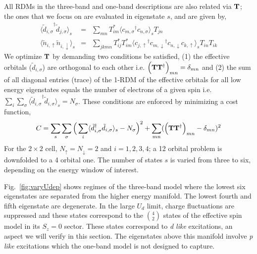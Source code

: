 All RDMs in the three-band and one-band descriptions are also related via ${\bf T}$; 
the ones that we focus on are evaluated in eigenstate $s$, and are given by,
\begin{subequations}
\begin{eqnarray}
	\langle {\tilde{d}_{i,\sigma}}^{\dagger} \tilde{d}_{j,\sigma} \rangle_{s} &=& \sum_{mn} T^{*}_{im} \langle {c_{m,\sigma}}^{\dagger} c_{n,\sigma} \rangle_{s} T_{jn} \label{eq:dmstransformations1} \\
	\langle \tilde{n}_{i,\uparrow} \tilde{n}_{i,\downarrow} \rangle_{s} &=& \sum_{jkmn} T^{*}_{ij} T^{*}_{im} \langle {c_{j,\uparrow}}^{\dagger} {c_{m,\downarrow}}^{\dagger} c_{n,\downarrow} c_{k,\uparrow} \rangle_{s} T_{in} T_{ik}
\label{eq:dmstransformations2}
\end{eqnarray}
\end{subequations}
We optimize ${\bf T}$ by demanding two conditions be satisfied, (1) the effective orbitals ($\tilde{d}_{i,\sigma}$) 
are orthogonal to each other i.e. $\Big({\bf T} {\bf T}^{\dagger}\Big)_{mn} = \delta_{mn}$
and (2) the sum of all diagonal entries (trace) of the 1-RDM of the effective orbitals for all low energy eigenstates 
equals the number of electrons of a given spin i.e. $\sum_{i} \sum_{\sigma} \langle {\tilde{d}_{i,\sigma}}^{\dagger} \tilde{d}_{i,\sigma} \rangle_{s} = N_{\sigma}$. 
These conditions are enforced by minimizing a cost function,
\begin{equation}
C = \sum_{s} \sum_{\sigma} \Big( \sum_{i} \langle \tilde{d}_{i,\sigma}^{\dagger} \tilde{d}_{i,\sigma} \rangle_{s} - N_{\sigma} \Big)^{2} + \sum_{mn} ( \Big({\bf T} {\bf T}^{\dagger}\Big)_{mn} -\delta_{mn})^{2}
\label{eq:C}
\end{equation} 
For the $2\times2$ cell, $N_{\uparrow}=N_{\downarrow}=2$ and $i=1,2,3,4$; a 12 orbital problem 
is downfolded to a 4 orbital one. The number of states $s$ is 
varied from three to six, depending on the energy window of interest.  

Fig.~\ref{fig:varyUdep} shows regimes of the three-band model where 
the lowest six eigenstates are separated from the higher energy manifold. 
The lowest fourth and fifth eigenstate are degenerate. 
In the large $U_d$ limit, charge fluctuations are suppressed and these states 
correspond to the $4 \choose 2$ states of the effective spin model in its $S_z=0$ sector.
These states correspond to \textit{d like} excitations, an aspect we will verify in this section. 
The eigenstates above this manifold involve \textit{p like} excitations which the one-band model is not designed to capture. 

